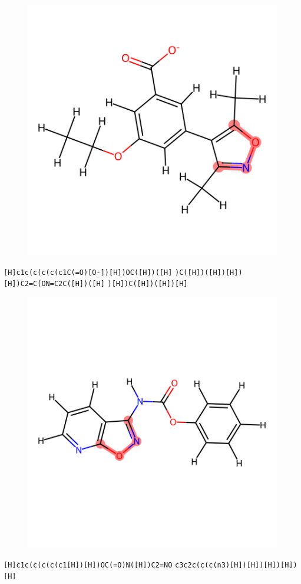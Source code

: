\documentclass{article}
\begin{document}
\begin{figure}[ht]
\centering
    \includegraphics{mol02.png}
\end{figure}
\verb|[H]c1c(c(c(c(c1C(=O)[O-])[H])OC([H])([H]| \verb|)C([H])([H])[H])[H])C2=C(ON=C2C([H])([H]| \verb|)[H])C([H])([H])[H]|

\begin{figure}[ht]
\centering
    \includegraphics{mol03.png}
\end{figure}
\verb|[H]c1c(c(c(c(c1[H])[H])OC(=O)N([H])C2=NO| \verb|c3c2c(c(c(n3)[H])[H])[H])[H])[H]|
\end{document}
